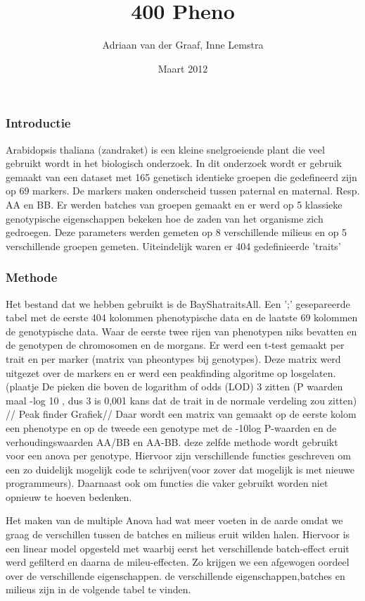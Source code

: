 \documentclass[12pt,a4paper, twocolumn]{article}
\author{Adriaan van der Graaf, Inne Lemstra}
\title{400 Pheno}
\date{Maart 2012}
\begin{document}
\maketitle

\subsubsection*{Introductie}
Arabidopsis thaliana (zandraket) is een kleine snelgroeiende plant die veel gebruikt wordt in het biologisch onderzoek.
In dit onderzoek wordt er gebruik gemaakt van een dataset met 165 genetisch identieke groepen die gedefineerd zijn op 69 markers.
De markers maken onderscheid tussen paternal en maternal. Resp. AA en BB.
Er werden batches van groepen gemaakt en er werd op 5 klassieke genotypische eigenschappen bekeken hoe de zaden van het organisme zich gedroegen.
Deze parameters werden gemeten op 8 verschillende milieus en op 5 verschillende groepen gemeten.
Uiteindelijk waren er 404 gedefinieerde 'traits'\\
\subsubsection*{Methode}
Het bestand dat we hebben gebruikt is de BayShatraitsAll. 
Een ';' gesepareerde tabel met de eerste 404 kolommen phenotypische data en de laatste 69 kolommen de genotypische data.
Waar de eerste twee rijen van phenotypen niks bevatten en de genotypen de chromosomen en de morgans.
Er werd een t-test gemaakt per trait en per marker (matrix van pheontypes bij genotypes).
Deze matrix werd uitgezet over de markers en er werd een peakfinding algoritme op losgelaten. (plaatje
De pieken die boven de logarithm of odds (LOD) 3 zitten (P waarden maal -log 10 , dus 3 is 0,001 kans dat de trait in de normale verdeling zou zitten) //
Peak finder Grafiek//
Daar wordt een matrix van gemaakt op de eerste kolom een phenotype en op de tweede een genotype met de -10log P-waarden en de  verhoudingswaarden AA/BB en AA-BB.
deze zelfde methode wordt gebruikt voor een anova per genotype. 
Hiervoor zijn verschillende functies geschreven om een zo duidelijk mogelijk code te schrijven(voor zover dat mogelijk is met nieuwe programmeurs).
Daarnaast ook om functies die vaker gebruikt worden niet opnieuw te hoeven bedenken.

Het maken van de multiple Anova had wat meer voeten in de aarde omdat we graag de verschillen tussen de batches en milieus eruit wilden halen.
Hiervoor is een linear model opgesteld met waarbij eerst het verschillende batch-effect eruit werd gefilterd en daarna de mileu-effecten.
Zo krijgen we een afgewogen oordeel over de verschillende eigenschappen.
de verschillende eigenschappen,batches en milieus zijn in de volgende tabel te vinden.\\
\end{document}

